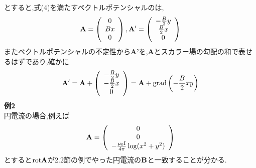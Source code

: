 \documentclass{jsarticle}
\begin{document}
とすると,式(4)を満たすベクトルポテンシャルのは,
\begin{eqnarray*}
{\bf A}=\left(
\begin{array}{c}
0 \\
Bx \\
0
\end{array}
\right),
{\bf A'}=\left(
\begin{array}{c}
- \frac{B}{2}y \\
\frac{B}{2}x \\
0
\end{array}
\right)
\end{eqnarray*}
またベクトルポテンシャルの不定性から{\bf A'}を,{\bf A}とスカラー場の勾配の和で表せるはずであり,確かに \\
\begin{eqnarray*}
{\bf A'} = {\bf A} +\left(
\begin{array}{c}
- \frac{B}{2}y \\
-\frac{B}{2}x \\
0
\end{array}
\right)
={\bf A}+ {\rm grad}\left(-\frac{B}{2}xy\right)
\end{eqnarray*}
{\bf 例2} \\
円電流の場合,例えば
\begin{eqnarray*}
{\bf A} = \left(
\begin{array}{c}
0 \\
0 \\
-\frac{\mu_0 {\rm I}}{4 \pi} \log(x^2+y^2)
\end{array}
\right)
\end{eqnarray*}
とすると${\rm rot}{\bf A}$が2.2節の例でやった円電流の${\bf B}$と一致することが分かる.
\end{document}
